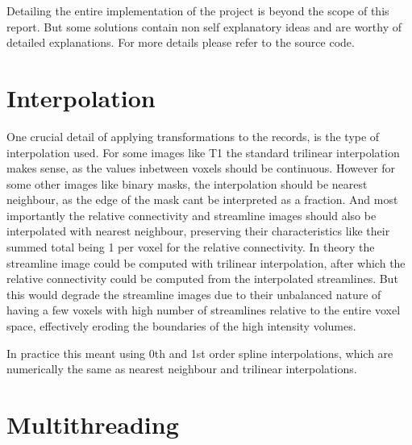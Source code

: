 \label{app:impl}

Detailing the entire implementation of the project is beyond the scope of this report. But some solutions contain non self explanatory ideas and are worthy of detailed explanations. For more details please refer to the source code.

\section{Interpolation}

One crucial detail of applying transformations to the records, is the type of interpolation used. For some images like T1 the standard trilinear interpolation makes sense, as the values inbetween voxels should be continuous. However for some other images like binary masks, the interpolation should be nearest neighbour, as the edge of the mask cant be interpreted as a fraction. And most importantly the relative connectivity and streamline images should also be interpolated with nearest neighbour, preserving their characteristics like their summed total being 1 per voxel for the relative connectivity. In theory the streamline image could be computed with trilinear interpolation, after which the relative connectivity could be computed from the interpolated streamlines. But this would degrade the streamline images due to their unbalanced nature of having a few voxels with high number of streamlines relative to the entire voxel space, effectively eroding the boundaries of the high intensity volumes.\par
In practice this meant using 0th and 1st order spline interpolations, which are numerically the same as nearest neighbour and trilinear interpolations.

\section{Multithreading}


